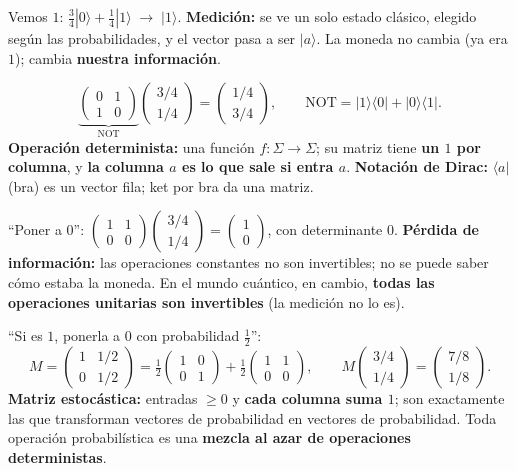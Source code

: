 \documentclass[11pt, a4paper, twoside, openright]{report}
\begin{document}
{Vemos $1$: \quad $\tfrac34|0\rangle + \tfrac14|1\rangle \;\longrightarrow\; |1\rangle$.}
{\textbf{Medición:} se ve un solo estado clásico, elegido según las probabilidades, y el vector pasa a ser $|a\rangle$. La moneda no cambia (ya era $1$); cambia \textbf{nuestra información}.}

{\[ \underbrace{\begin{pmatrix}0&1\\1&0\end{pmatrix}}_{\text{NOT}}\begin{pmatrix}3/4\\1/4\end{pmatrix} = \begin{pmatrix}1/4\\3/4\end{pmatrix}, \qquad \text{NOT} = |1\rangle\langle0| + |0\rangle\langle1|. \]}
{\textbf{Operación determinista:} una función $f:\Sigma\to\Sigma$; su matriz tiene \textbf{un $1$ por columna}, y \textbf{la columna $a$ es lo que sale si entra $a$}. \textbf{Notación de Dirac:} $\langle a|$ (bra) es un vector fila; ket por bra da una matriz.}

{``Poner a $0$'': \quad $\begin{pmatrix}1&1\\0&0\end{pmatrix}\begin{pmatrix}3/4\\1/4\end{pmatrix} = \begin{pmatrix}1\\0\end{pmatrix}$, \quad con determinante $0$.}
{\textbf{Pérdida de información:} las operaciones constantes no son invertibles; no se puede saber cómo estaba la moneda. En el mundo cuántico, en cambio, \textbf{todas las operaciones unitarias son invertibles} (la medición no lo es).}

{``Si es $1$, ponerla a $0$ con probabilidad $\frac12$'':
\[ M = \begin{pmatrix}1&1/2\\0&1/2\end{pmatrix} = \tfrac12\begin{pmatrix}1&0\\0&1\end{pmatrix} + \tfrac12\begin{pmatrix}1&1\\0&0\end{pmatrix}, \qquad M\begin{pmatrix}3/4\\1/4\end{pmatrix} = \begin{pmatrix}7/8\\1/8\end{pmatrix}. \]}
{\textbf{Matriz estocástica:} entradas $\ge0$ y \textbf{cada columna suma $1$}; son exactamente las que transforman vectores de probabilidad en vectores de probabilidad. Toda operación probabilística es una \textbf{mezcla al azar de operaciones deterministas}.}
\end{document}
